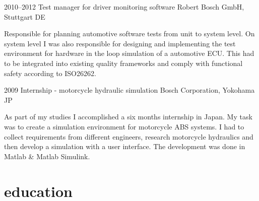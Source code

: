 \documentclass[]{friggeri-cv} %
\begin{document}
\begin{entrylist}
\entry
{2010--2012}
{Test manager for driver monitoring software}
{Robert Bosch GmbH, Stuttgart DE}
{Responsible for planning automotive software tests from unit to system level. On system level I was also responsible for designing and implementing the test environment for hardware in the loop simulation of a automotive ECU. This had to be integrated into existing quality frameworks and comply with functional safety according to ISO26262.

}
\end{entrylist}
\begin{entrylist}
\entry
{2009}
{Internship - motorcycle hydraulic simulation}
{Bosch Corporation, Yokohama JP}
{As part of my studies I accomplished a six months internship in Japan. My task was to create a simulation environment for motorcycle ABS systems. I had to collect requirements from different engineers, research motorcycle hydraulics and then develop a simulation with a user interface. The development was done in Matlab \& Matlab Simulink.

}
\end{entrylist}

\section{\color{blue}education}
\end{document}
